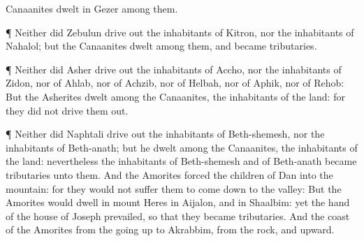 {Canaanites
dwelt in
Gezer
among them.
\par }{\PP {}¶ Neither did
Zebulun drive
out the
inhabitants of
Kitron, nor the
inhabitants of
Nahalol; but the
Canaanites
dwelt
among them, and became
tributaries.
\par }{\PP {}¶ Neither did
Asher drive
out the
inhabitants of
Accho, nor the
inhabitants of
Zidon, nor of
Ahlab, nor of
Achzib, nor of
Helbah, nor of
Aphik, nor of
Rehob:
But the
Asherites
dwelt
among the
Canaanites, the
inhabitants of the
land: for they did not drive them
out.
\par }{\PP {}¶ Neither did
Naphtali drive
out the
inhabitants of
Beth-shemesh, nor the
inhabitants of
Beth-anath; but he
dwelt
among the
Canaanites, the
inhabitants of the
land: nevertheless the
inhabitants of
Beth-shemesh and of
Beth-anath became
tributaries unto them.
And the
Amorites
forced the
children of
Dan into the
mountain: for they would not
suffer them to come
down to the
valley:
But the
Amorites
would
dwell in
mount
Heres in
Aijalon, and in
Shaalbim: yet the
hand of the
house of
Joseph
prevailed, so that they became
tributaries.
And the
coast of the
Amorites
{} from the going
up to
Akrabbim, from the
rock, and
upward.

}
